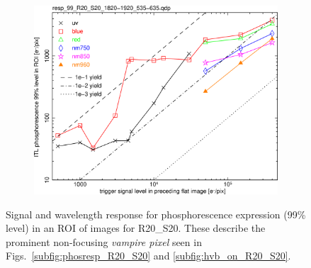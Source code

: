\begin{figure}[!htbp]
\centering
\begin{subfigure}{0.45\textwidth}    
  \centering
  \includegraphics[width=\textwidth]{figures/phosphorescence-survey/phos_resp/resp_99_R20_S20_1820-1920_535-635.png}    
\end{subfigure}
\newline
\caption{Signal and wavelength response for phosphorescence expression (99\% level) in an ROI of images for R20\_S20. These describe the prominent non-focusing {\it vampire pixel} seen in Figs.~\ref{subfig:phosresp_R20_S20} and \ref{subfig:hvb_on_R20_S20}.}
\label{fig:phos:kinetics:R20S20}
\end{figure}

